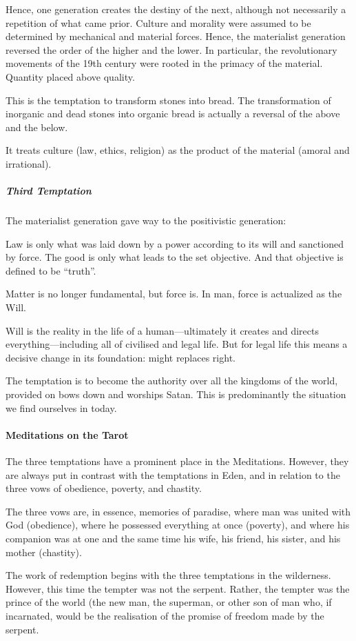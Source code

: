 Hence, one generation creates the destiny of the next, although not necessarily a repetition of what came prior. Culture and morality were assumed to be determined by mechanical and material forces. Hence, the materialist generation reversed the order of the higher and the lower. In particular, the revolutionary movements of the 19th century were rooted in the primacy of the material. Quantity placed above quality.

This is the temptation to transform stones into bread. The transformation of inorganic and dead stones into organic bread is actually a reversal of the above and the below.

It treats culture (law, ethics, religion) as the product of the material (amoral and irrational).

\subparagraph{Third Temptation}
The materialist generation gave way to the positivistic generation:

Law is only what was laid down by a power according to its will and sanctioned by force. The good is only what leads to the set objective. And that objective is defined to be “truth”.

Matter is no longer fundamental, but force is. In man, force is actualized as the Will.

\begin{quotex}
Will is the reality in the life of a human—ultimately it creates and directs everything—including all of civilised and legal life. But for legal life this means a decisive change in its foundation: might replaces right. 

\end{quotex}
The temptation is to become the authority over all the kingdoms of the world, provided on bows down and worships Satan. This is predominantly the situation we find ourselves in today.

\paragraph{Meditations on the Tarot}
The three temptations have a prominent place in the Meditations. However, they are always put in contrast with the temptations in Eden, and in relation to the three vows of obedience, poverty, and chastity.

\begin{quotex}
The three vows are, in essence, memories of paradise, where man was united with God (obedience), where he possessed everything at once (poverty), and where his companion was at one and the same time his wife, his friend, his sister, and his mother (chastity). 

\end{quotex}
The work of redemption begins with the three temptations in the wilderness. However, this time the tempter was not the serpent. Rather, the tempter was the prince of the world (the new man, the superman, or other son of man who, if incarnated, would be the realisation of the promise of freedom made by the serpent.

